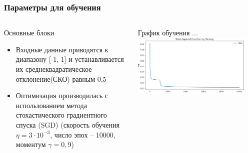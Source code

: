 \begin{frame}[t]
    \frametitle{Параметры для обучения}
    \begin{columns}[T]
    \begin{block}{\centering Основные блоки}                
        \begin{itemize}\small
            \item Входные данные приводятся к диапазону [-1, 1] и устанавливается их
            среднеквадратическое отклонение(СКО) равным 0,5
            \item Оптимизация производилась с использованием метода стохастического градиентного спуска (SGD)
            (скорость обучения $\eta =3 \cdot 10^{-3}$, число эпох -- 10000, моментум $\gamma = 0,9$)
        \end{itemize}
    \end{block}
     
    \begin{block}{\centering График обучения ...}
        \vspace{3mm}
        \centering \includegraphics[width = 0.9\textwidth]{pics/MSE.png} %
    \end{block}
    \end{columns}
    
    \end{frame}
    